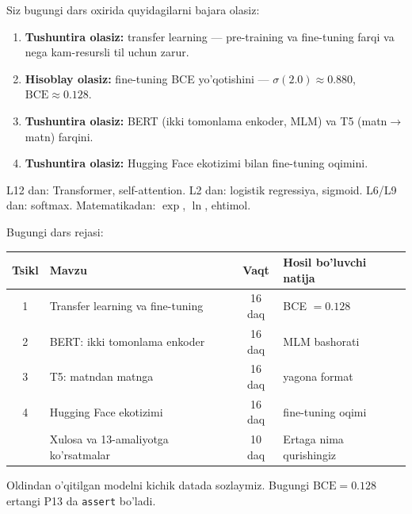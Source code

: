 \documentclass[aspectratio=169,11pt]{beamer}
\begin{document}
\begin{frame}{Siz bugungi dars oxirida quyidagilarni bajara olasiz:}
  \begin{enumerate}\setlength\itemsep{6pt}
    \item \textbf{Tushuntira olasiz:} transfer learning --- pre-training va
          fine-tuning farqi va nega kam-resursli til uchun zarur.
    \item \textbf{Hisoblay olasiz:} fine-tuning BCE yo'qotishini ---
          $\sigma(2.0)\approx 0.880$, $\mathrm{BCE}\approx 0.128$.
    \item \textbf{Tushuntira olasiz:} BERT (ikki tomonlama enkoder, MLM) va
          T5 (matn$\to$matn) farqini.
    \item \textbf{Tushuntira olasiz:} Hugging Face ekotizimi bilan fine-tuning oqimini.
  \end{enumerate}
  \vspace{4pt}
  \begin{tcolorbox}[defbox,title=Oldindan talab]
    \footnotesize
    L12 dan: Transformer, self-attention. L2 dan: logistik regressiya, sigmoid.
    L6/L9 dan: softmax. Matematikadan: $\exp$, $\ln$, ehtimol.
  \end{tcolorbox}
\end{frame}

\begin{frame}{Bugungi dars rejasi:}
  \begin{center}
  \small
  \begin{tabular}{c p{5.2cm} c p{3.0cm}}
    \toprule
    \textbf{Tsikl}& \textbf{Mavzu} & \textbf{Vaqt} & \textbf{Hosil bo'luvchi natija}\\
    \midrule
    1 & Transfer learning va fine-tuning & 16 daq & BCE $=0.128$ \\
    2 & BERT: ikki tomonlama enkoder & 16 daq & MLM bashorati \\
    3 & T5: matndan matnga & 16 daq & yagona format \\
    4 & Hugging Face ekotizimi & 16 daq & fine-tuning oqimi \\
    \midrule
      & Xulosa va 13-amaliyotga ko'rsatmalar & 10 daq & Ertaga nima qurishingiz \\
    \bottomrule
  \end{tabular}
  \end{center}
  \vspace{4pt}
  \begin{tcolorbox}[warnbox,title=Bu dars fine-tuning'ga olib keladi]
    \footnotesize\sloppy
    Oldindan o'qitilgan modelni kichik datada sozlaymiz. Bugungi
    $\mathrm{BCE}=0.128$ ertangi P13 da \texttt{assert} bo'ladi.
  \end{tcolorbox}
\end{frame}
\end{document}
